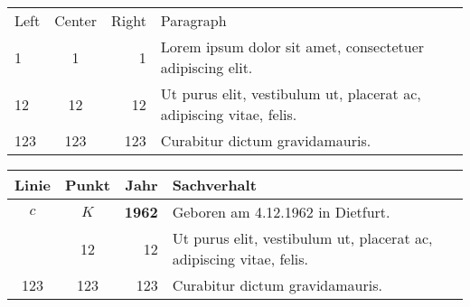 \documentclass[10pt,a4paper]{article}
\begin{document}
  
\begin{tabular}{||l|c|r|p{6cm}||}
    Left & Center & Right & Paragraph \\
    1 & 1 & 1 & Lorem ipsum dolor sit amet, consectetuer adipiscing elit. \\
    12 & 12 & 12 & Ut purus elit, vestibulum ut, placerat ac, adipiscing vitae, felis. \\
    123 & 123 & 123 & Curabitur dictum gravidamauris. \\
\end{tabular}

\vskip 16pt
\begin{table}[h!]
\begin{tabular}{@{}c|c|r|p{8cm}||}
  Linie & Punkt & Jahr & Sachverhalt \\
  \hline
  $c$   & $K$ & {\bf 1962} & Geboren am 4.12.1962 in Dietfurt. \\
  \  & 12 & 12 & Ut purus elit, vestibulum ut, placerat ac, adipiscing vitae, felis. \\
  123 & 123 & 123 & Curabitur dictum gravidamauris. \\
\end{tabular}
\end{table}
\end{document}

